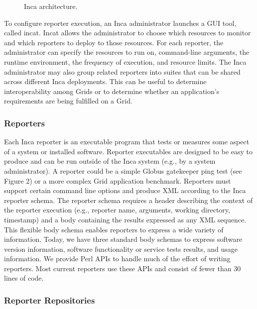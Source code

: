 \documentclass[times, 10pt,twocolumn]{article}
\begin{document}
\begin{figure*}[Htb]
  \centering
  \mbox{}
  \caption{\label{arch_fig} Inca architecture.}
\end{figure*}


To configure reporter execution, an Inca administrator launches a GUI tool,
called incat.  Incat allows the administrator to choose which resources to
monitor and which reporters to deploy to those resources.  For each
reporter, the administrator can specify the resources to run on,
command-line arguments, the runtime environment, the frequency of execution,
and resource limits. The Inca administrator may also group related reporters
into suites that can be shared across different Inca deployments.  This can
be useful to determine interoperability among Grids or to determine whether
an application's requirements are being fulfilled on a Grid.

\subsubsection{Reporters}

Each Inca reporter is an executable program that tests or measures some
aspect of a system or installed software.   Reporter executables are
designed to be easy to produce and can be run outside of the Inca system
(e.g., by a system administrator).  A reporter could be a simple Globus
gatekeeper ping test (see Figure 2) or a more complex Grid application
benchmark.  Reporters must support certain command line options and produce
XML according to the Inca reporter schema.  The reporter schema requires a
header describing the context of the reporter execution (e.g., reporter
name, arguments, working directory, timestamp) and a body containing the
results expressed as any XML sequence. This flexible body schema enables
reporters to express a wide variety of information.  Today, we have three
standard body schemas to express software version information, software
functionality or service tests results, and usage information.  We provide
Perl APIs to handle much of the effort of writing reporters.  Most current
reporters use these APIs and consist of fewer than 30 lines of code.  

\subsubsection{Reporter Repositories}
\end{document}
